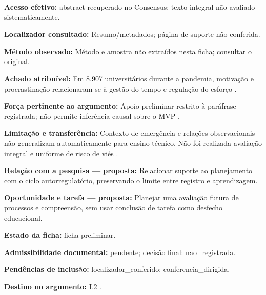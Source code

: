 \noindent\textbf{Acesso efetivo:} abstract recuperado no Consensus; texto integral não avaliado sistematicamente.\par\medskip

\noindent\textbf{Localizador consultado:} Resumo/metadados; página de suporte não conferida.\par\medskip

\noindent\textbf{Método observado:} Método e amostra não extraídos nesta ficha; consultar o original.\par\medskip

\noindent\textbf{Achado atribuível:} Em 8.907 universitários durante a pandemia, motivação e procrastinação relacionaram-se à gestão do tempo e regulação do esforço \citep{education_forstervold2022}.\par\medskip

\noindent\textbf{Força pertinente ao argumento:} Apoio preliminar restrito à paráfrase registrada; não permite inferência causal sobre o MVP \citep{education_forstervold2022}.\par\medskip

\noindent\textbf{Limitação e transferência:} Contexto de emergência e relações observacionais não generalizam automaticamente para ensino técnico. Não foi realizada avaliação integral e uniforme de risco de viés \citep{education_forstervold2022}.\par\medskip

\noindent\textbf{Relação com a pesquisa — proposta:} Relacionar suporte ao planejamento com o ciclo autorregulatório, preservando o limite entre registro e aprendizagem.\par\medskip

\noindent\textbf{Oportunidade e tarefa — proposta:} Planejar uma avaliação futura de processos e compreensão, sem usar conclusão de tarefa como desfecho educacional.\par\medskip

\noindent\textbf{Estado da ficha:} ficha preliminar.\par\medskip

\noindent\textbf{Admissibilidade documental:} pendente; decisão final: nao\_registrada.\par\medskip

\noindent\textbf{Pendências de inclusão:} localizador\_conferido; conferencia\_dirigida.\par\medskip

\noindent\textbf{Destino no argumento:} L2 .

